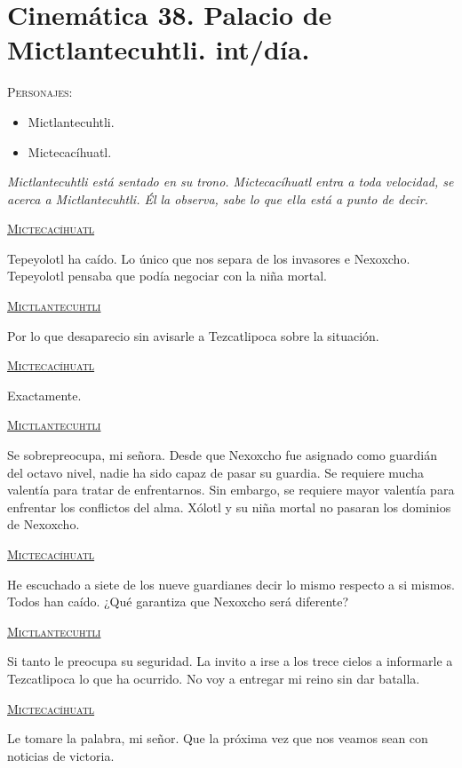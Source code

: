 \section{Cinemática 38. Palacio de Mictlantecuhtli. int/día.} \label{Cin:Cinematica38}
 \textsc{Personajes}:
 \begin{itemize}
 \item Mictlantecuhtli.
 \item Mictecacíhuatl.

 \end{itemize}
\textit{Mictlantecuhtli está sentado en su trono. Mictecacíhuatl entra a toda velocidad, se acerca a Mictlantecuhtli. Él la observa, sabe lo que ella está a punto de decir.}
\begin{center}
\textsc{\underline{Mictecacíhuatl}}
\\
\par
Tepeyolotl ha caído. Lo único que nos separa de los invasores e Nexoxcho. Tepeyolotl pensaba que podía negociar con la niña mortal.
\\
\par
\textsc{\underline{Mictlantecuhtli}}
\\
\par
Por lo que desaparecio sin avisarle a Tezcatlipoca sobre la situación. 
\\
\par
\textsc{\underline{Mictecacíhuatl}}
\\
\par
Exactamente.
\\
\par
\textsc{\underline{Mictlantecuhtli}}
\\
\par
Se sobrepreocupa, mi señora. Desde que Nexoxcho fue asignado como guardián del octavo nivel, nadie ha sido capaz de pasar su guardia. Se requiere mucha valentía para tratar de enfrentarnos. Sin embargo, se requiere mayor valentía para enfrentar los conflictos del alma. Xólotl y su niña mortal no pasaran los dominios de Nexoxcho.
\\
\par
\textsc{\underline{Mictecacíhuatl}}
\\
\par
He escuchado a siete de los nueve guardianes decir lo mismo respecto a si mismos. Todos han caído. ¿Qué garantiza que Nexoxcho será diferente?
\\
\par
\textsc{\underline{Mictlantecuhtli}}
\\
\par
Si tanto le preocupa su seguridad. La invito a irse a los trece cielos a informarle a Tezcatlipoca lo que ha ocurrido. No voy a entregar mi reino sin dar batalla.
\\
\par
\textsc{\underline{Mictecacíhuatl}}
\\
\par
Le tomare la palabra, mi señor. Que la próxima vez que nos veamos sean con noticias de victoria.
\end{center}
